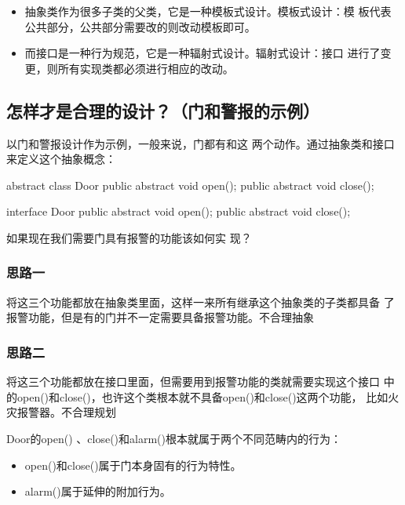 \begin{itemize}
\item 抽象类作为很多子类的父类，它是一种模板式设计。{\Red 模板式设计：模
    板代表公共部分，公共部分需要改的则改动模板即可。}
\item 而接口是一种行为规范，它是一种辐射式设计。{\Red 辐射式设计：接口
    进行了变更，则所有实现类都必须进行相应的改动。}
\end{itemize}



\subsection{怎样才是合理的设计？（门和警报的示例）}

以门和警报设计作为示例，一般来说，门都有和这
两个动作。通过抽象类和接口来定义这个抽象概念：

\begin{javaCode}
  abstract class Door {
    public abstract void open();
    public abstract void close();
  }
\end{javaCode}

\begin{javaCode}
  interface Door {
    public abstract void open();
    public abstract void close();
  }
\end{javaCode}

 如果现在我们需要门具有报警的功能该如何实
现？

\subsubsection{思路一} 
  
将这三个功能都放在抽象类里面，这样一来所有继承这个抽象类的子类都具备
了报警功能，但是有的门并不一定需要具备报警功能。{\hei\Red 不合理抽象}

  
\subsubsection{思路二} 

将这三个功能都放在接口里面，但需要用到报警功能的类就需要实现这个接口
中的open()和close()，也许这个类根本就不具备open()和close()这两个功能，
比如火灾报警器。{\hei\Red 不合理规划}

Door的open() 、close()和alarm()根本就属于两个不同范畴内的行为：

\begin{itemize}
\item open()和close()属于门本身固有的行为特性。
\item alarm()属于延伸的附加行为。
\end{itemize}

